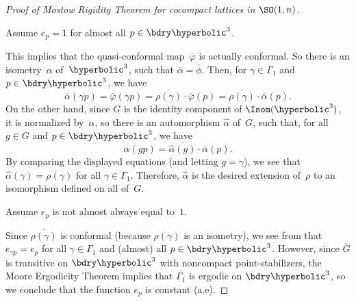 \begin{proof}[Proof  of Mostow Rigidity Theorem for cocompact lattices in $\SO(1,n)$]
\begin{case}
Assume $e_p = 1$ for almost all $p \in \bdry\hyperbolic^3$.
\end{case}
This implies that the quasi-conformal map~$\overline\varphi$ is actually conformal. So there is an isometry~$\alpha$ of~$\hyperbolic^3$, such that $\overline\alpha = \overline\phi$. Then, for $\gamma \in \Gamma_1$ and $p \in \bdry\hyperbolic^3$, we have
	$$ \overline\alpha( \gamma p)
	= \overline\varphi( \gamma p)
	= \overline{\rho(\gamma)} \cdot \overline\varphi(p)
	= \overline{\rho(\gamma)} \cdot \overline\alpha(p)
	. $$
On the other hand, since $G$ is the identity component of $\Isom(\hyperbolic^3)$, it is normalized by~$\alpha$, so there is an automorphism $\widehat\alpha$ of~$G$, such that, for all $g \in G$ and $p \in \bdry\hyperbolic^3$, we have
	$$ \overline\alpha(gp) = \overline{\widehat\alpha(g)} \cdot \overline\alpha(p) .$$
By comparing the displayed equations (and letting $g = \gamma$), we see that $\widehat\alpha(\gamma) = \rho(\gamma)$ for all $\gamma \in \Gamma_1$. Therefore, $\widehat\alpha$ is the desired extension of~$\rho$ to an isomorphism defined on all of~$G$.

\begin{case} \label{MostowPfSO13Not1}
Assume $e_p$ is not almost always equal to~$1$.
\end{case}
Since $\overline{\rho(\gamma)}$ is conformal (because $\rho(\gamma)$ is an isometry), we see from  that $e_{\gamma p} = e_p$ for all $\gamma \in \Gamma_1$ and (almost) all $p \in \bdry\hyperbolic^3$. However, since $\overline{G}$ is transitive on $\bdry\hyperbolic^3$ with noncompact point-stabilizers, the Moore Ergodicity Theorem  implies that $\overline{\Gamma_1}$ is ergodic on $\bdry\hyperbolic^3$, so we conclude that the function $e_p$ is  constant (a.e). 


\end{proof}
